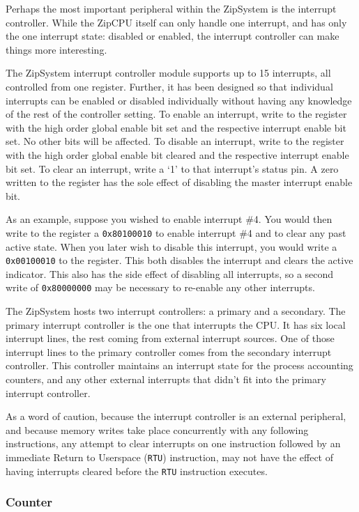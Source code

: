 \documentclass{gqtekspec}
\begin{document}
Perhaps the most important peripheral within the ZipSystem is the interrupt
controller.  While the ZipCPU itself can only handle one interrupt, and has
only the one interrupt state: disabled or enabled, the interrupt controller
can make things more interesting.

The ZipSystem interrupt controller module supports up to 15 interrupts, all
controlled from one register.  Further, it has been designed so that individual
interrupts can be enabled or disabled individually without having any knowledge
of the rest of the controller setting.  To enable an interrupt, write to the
register with the high order global enable bit set and the respective interrupt
enable bit set.  No other bits will be affected.  To disable an interrupt,
write to the register with the high order global enable bit cleared and the
respective interrupt enable bit set.  To clear an interrupt, write a `1' to
that interrupt's status pin.  A zero written to the register has the sole
effect of disabling the master interrupt enable bit.

As an example, suppose you wished to enable interrupt \#4.  You would then
write to the register a {\tt 0x80100010} to enable interrupt \#4 and to clear
any past active state.  When you later wish to disable this interrupt, you would
write a {\tt 0x00100010} to the register.  This both disables the
interrupt and clears the active indicator.  This also has the side effect of
disabling all interrupts, so a second write of {\tt 0x80000000} may be necessary
to re-enable any other interrupts.

The ZipSystem hosts two interrupt controllers: a primary and a secondary.  The
primary interrupt controller is the one that interrupts the CPU.  It has
six local interrupt lines, the rest coming from external interrupt sources.
One of those interrupt lines to the primary controller comes from the secondary
interrupt controller.  This controller maintains an interrupt state for the
process accounting counters, and any other external interrupts that didn't fit
into the primary interrupt controller.

As a word of caution, because the interrupt controller is an external
peripheral, and because memory writes take place concurrently with any following
instructions, any attempt to clear interrupts on one instruction followed by
an immediate Return to Userspace ({\tt RTU}) instruction, may not have the
effect of having interrupts cleared before the {\tt RTU} instruction executes.

\subsubsection{Counter}
\end{document}
